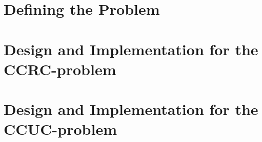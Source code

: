 

\part{Defining the Problem}


\part{Design and Implementation for the CCRC-problem}




\part{Design and Implementation for the CCUC-problem}






